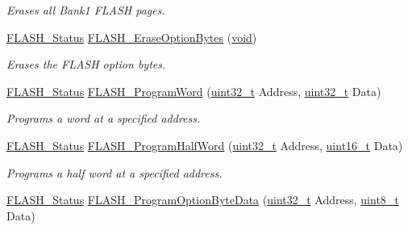 \begin{DoxyCompactItemize}
\begin{DoxyCompactList}\small\item\em Erases all Bank1 F\+L\+A\+SH pages. \end{DoxyCompactList}\item 
\hyperlink{group___f_l_a_s_h___exported___types_gadc63a6f3404ff1f71229a66915e9cdc0}{F\+L\+A\+S\+H\+\_\+\+Status} \hyperlink{group___f_l_a_s_h___private___functions_ga152768609e85d74a9d8474be8dc2874b}{F\+L\+A\+S\+H\+\_\+\+Erase\+Option\+Bytes} (\hyperlink{usb__devapi_8h_afabf60e7f57651d6d595a02c75f07cd0}{void})
\begin{DoxyCompactList}\small\item\em Erases the F\+L\+A\+SH option bytes. \end{DoxyCompactList}\item 
\hyperlink{group___f_l_a_s_h___exported___types_gadc63a6f3404ff1f71229a66915e9cdc0}{F\+L\+A\+S\+H\+\_\+\+Status} \hyperlink{group___f_l_a_s_h___private___functions_gaac9a2f400b92537bd42a6bd7cc237b11}{F\+L\+A\+S\+H\+\_\+\+Program\+Word} (\hyperlink{_p_e___types_8h_a33594304e786b158f3fb30289278f5af}{uint32\+\_\+t} Address, \hyperlink{_p_e___types_8h_a33594304e786b158f3fb30289278f5af}{uint32\+\_\+t} Data)
\begin{DoxyCompactList}\small\item\em Programs a word at a specified address. \end{DoxyCompactList}\item 
\hyperlink{group___f_l_a_s_h___exported___types_gadc63a6f3404ff1f71229a66915e9cdc0}{F\+L\+A\+S\+H\+\_\+\+Status} \hyperlink{group___f_l_a_s_h___private___functions_ga5c1336f667950a8765887228f1d0d501}{F\+L\+A\+S\+H\+\_\+\+Program\+Half\+Word} (\hyperlink{_p_e___types_8h_a33594304e786b158f3fb30289278f5af}{uint32\+\_\+t} Address, \hyperlink{_p_e___types_8h_a1f1825b69244eb3ad2c7165ddc99c956}{uint16\+\_\+t} Data)
\begin{DoxyCompactList}\small\item\em Programs a half word at a specified address. \end{DoxyCompactList}\item 
\hyperlink{group___f_l_a_s_h___exported___types_gadc63a6f3404ff1f71229a66915e9cdc0}{F\+L\+A\+S\+H\+\_\+\+Status} \hyperlink{group___f_l_a_s_h___private___functions_ga1382ff9d4ded8a5c076fde4fff529d21}{F\+L\+A\+S\+H\+\_\+\+Program\+Option\+Byte\+Data} (\hyperlink{_p_e___types_8h_a33594304e786b158f3fb30289278f5af}{uint32\+\_\+t} Address, \hyperlink{_p_e___types_8h_aba7bc1797add20fe3efdf37ced1182c5}{uint8\+\_\+t} Data)

\end{DoxyCompactItemize}
